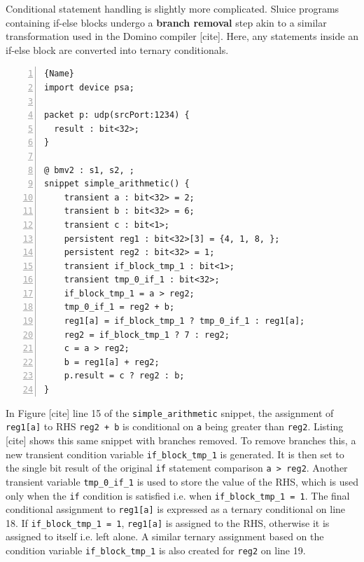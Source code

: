 \documentclass[12pt, oneside]{article}
\begin{document}
Conditional statement handling is slightly more complicated. Sluice programs containing if-else blocks undergo a \textbf{branch removal} step akin to a similar transformation used in the Domino compiler [cite]. Here, any statements inside an if-else block are converted into ternary conditionals. 

\begin{lstlisting}[numbers=left, firstnumber=1, frame=tlrb, basicstyle=\linespread{1.3}\scriptsize]{Name}
import device psa;

packet p: udp(srcPort:1234) {
  result : bit<32>;
}

@ bmv2 : s1, s2, ;
snippet simple_arithmetic() {
    transient a : bit<32> = 2;
    transient b : bit<32> = 6;
    transient c : bit<1>;
    persistent reg1 : bit<32>[3] = {4, 1, 8, };
    persistent reg2 : bit<32> = 1;
    transient if_block_tmp_1 : bit<1>;
    transient tmp_0_if_1 : bit<32>;
    if_block_tmp_1 = a > reg2;
    tmp_0_if_1 = reg2 + b;
    reg1[a] = if_block_tmp_1 ? tmp_0_if_1 : reg1[a];
    reg2 = if_block_tmp_1 ? 7 : reg2;
    c = a > reg2;
    b = reg1[a] + reg2;
    p.result = c ? reg2 : b;
}
\end{lstlisting}

In Figure [cite] line 15 of the \texttt{simple\_arithmetic} snippet, the assignment of \texttt{reg1[a]} to RHS \texttt{reg2 + b} is conditional on \texttt{a} being greater than \texttt{reg2}. Listing [cite] shows this same snippet with branches removed. To remove branches this, a new transient condition variable \texttt{if\_block\_tmp\_1} is generated. It is then set to the single bit result of the original \texttt{if} statement comparison \texttt{a > reg2}. Another transient variable \texttt{tmp\_0\_if\_1} is used to store the value of the RHS, which is used only when the \texttt{if} condition is satisfied i.e. when \texttt{if\_block\_tmp\_1 = 1}. The final conditional assignment to \texttt{reg1[a]} is expressed as a ternary conditional on line 18. If \texttt{if\_block\_tmp\_1 = 1}, \texttt{reg1[a]} is assigned to the RHS, otherwise it is assigned to itself i.e. left alone. A similar ternary assignment based on the condition variable \texttt{if\_block\_tmp\_1} is also created for \texttt{reg2} on line 19. 
\end{document}
